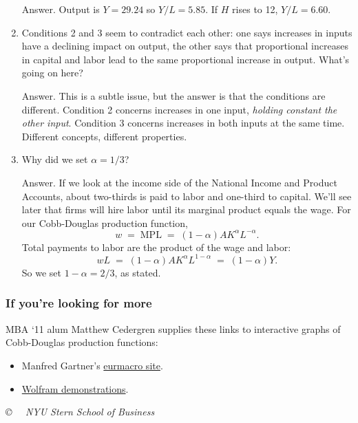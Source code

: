 \documentclass[letterpaper,12pt]{article}
\begin{document}
\begin{enumerate}
Answer.  Output is $Y = 29.24$ so $Y/L = 5.85$.  If $H$ rises to 12,
$Y/L = 6.60 $.

\item Conditions 2 and 3 seem to contradict each other:
one says increases in inputs have a declining impact on output,
the other says that proportional increases in capital and labor
lead to the same proportional increase in output.  What's going on here?

Answer.  This is a subtle issue, but the answer is that
the conditions are different.
Condition 2 concerns increases in one input,
{\it holding constant the other input\/}.
Condition 3 concerns increases in both inputs at the same time.
Different concepts, different properties.

\item Why did we set $\alpha = 1/3$?

Answer.  If we look at the income side of the National Income
and Product Accounts, about two-thirds is paid to labor
and one-third to capital.
We'll see later that firms will hire labor until its
marginal product equals the wage.
For our Cobb-Douglas production function,
\[
    w \;=\; \mbox{MPL} \;=\; (1-\alpha) A K^\alpha L^{-\alpha} .
\]
Total payments to labor are the product of the wage and labor:
\[
    w L  \;=\; (1-\alpha) A K^\alpha L^{1-\alpha} \;=\; (1-\alpha) Y.
\]
So we set $1-\alpha = 2/3$, as stated.

\end{enumerate}


\subsubsection*{If you're looking for more}

MBA `11 alum Matthew Cedergren
supplies these
links to interactive graphs of Cobb-Douglas production functions:
%
\begin{itemize}
\item  Manfred Gartner's
\href{http://www.fgn.unisg.ch/eurmacro/tutor/cobb-douglas.html}
{eurmacro site}.

\item
\href{http://demonstrations.wolfram.com/CobbDouglasProductionFunctions/}
{Wolfram demonstrations}.

\end{itemize}


\vfill \centerline{\it \copyright \ \number\year
\ NYU Stern School of Business}
\end{document}
